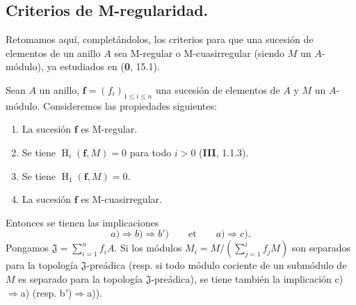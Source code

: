 \subsection{Criterios de M-regularidad.}
\label{subsection:IV.19.5}

Retomamos aquí, completándolos, los criterios para que una sucesión de elementos de un anillo $A$ sea M-regular o M-cuasirregular (siendo $M$ un $A$-módulo), ya estudiados en (\textbf{0}, 15.1).

\begin{theorem}[19.5.1]
\label{IV.19.5.1}
Sean $A$ un anillo, $\mathbf f=(f_i)_{1\leq i\leq n}$ una sucesión de elementos de $A$ y $M$ un $A$-módulo. Consideremos las propiedades siguientes:
\begin{enumerate}
  \item[\textup{a)}] La sucesión $\mathbf f$ es M-regular.
  \item[\textup{b)}] Se tiene $\operatorname{H}_i(\mathbf f,M)=0$ para todo $i>0$ \textup{(\textbf{III}, 1.1.3)}.
  \item[\textup{b$'$)}] Se tiene $\operatorname{H}_1(\mathbf f,M)=0$.
  \item[\textup{c)}] La sucesión $\mathbf f$ es M-cuasirregular.
\end{enumerate}
Entonces se tienen las implicaciones
\[
  \textit{a)}\Rightarrow\textit{b)}\Rightarrow\textit{b$'$)}\qquad\text{et}\qquad\textit{a)}\Rightarrow\textit{c)}.
\]
Pongamos $\mathfrak J=\sum_{i=1}^n f_iA$. Si los módulos $M_i=M/(\sum_{j=1}^i f_jM)$ son separados para la topología $\mathfrak J$-preádica \textup{(resp.} si todo módulo cociente de un submódulo de $M$ es separado para la topología $\mathfrak J$-preádica), se tiene también la implicación \textup{c)}$\Rightarrow$\textup{a)} \textup{(resp. b$'$)}$\Rightarrow$\textup{a))}.
\end{theorem}

